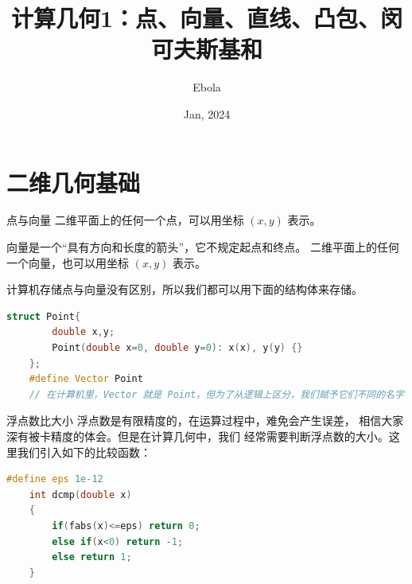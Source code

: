 \documentclass{beamer}
\author{Ebola}
\title{计算几何1：点、向量、直线、凸包、闵可夫斯基和}
\institute{
    Institute of Mathematics, \\
    Zhejiang University.
}
\date{Jan, 2024}
\begin{document}
\begin{frame}
    \titlepage
\end{frame}

\begin{frame}
    \tableofcontents[sectionstyle=show,subsectionstyle=show/shaded/hide,subsubsectionstyle=show/shaded/hide]
\end{frame}

\section{二维几何基础}

\begin{frame}[fragile]{点与向量}
    二维平面上的任何一个点，可以用坐标 $(x,y)$ 表示。
    \vspace{1em}

    \pause
    向量是一个“具有方向和长度的箭头”，它不规定起点和终点。
    二维平面上的任何一个向量，也可以用坐标 $(x,y)$ 表示。
    \vspace{1em}

    \pause
    计算机存储点与向量没有区别，所以我们都可以用下面的结构体来存储。
\begin{lstlisting}[language=c++]
    struct Point{
        double x,y;
        Point(double x=0, double y=0): x(x), y(y) {}
    };
    #define Vector Point
    // 在计算机里，Vector 就是 Point，但为了从逻辑上区分，我们赋予它们不同的名字
\end{lstlisting}
\end{frame}


\begin{frame}[fragile]{浮点数比大小}
    \small
    浮点数是有限精度的，在运算过程中，难免会产生误差，
    相信大家深有被卡精度的体会。但是在计算几何中，我们
    经常需要判断浮点数的大小。\pause 这里我们引入如下的比较函数：
\begin{lstlisting}[language=c++]
    #define eps 1e-12
    int dcmp(double x)
    {
        if(fabs(x)<=eps) return 0;
        else if(x<0) return -1;
        else return 1;
    }
\end{lstlisting}
\end{frame}
\end{document}

